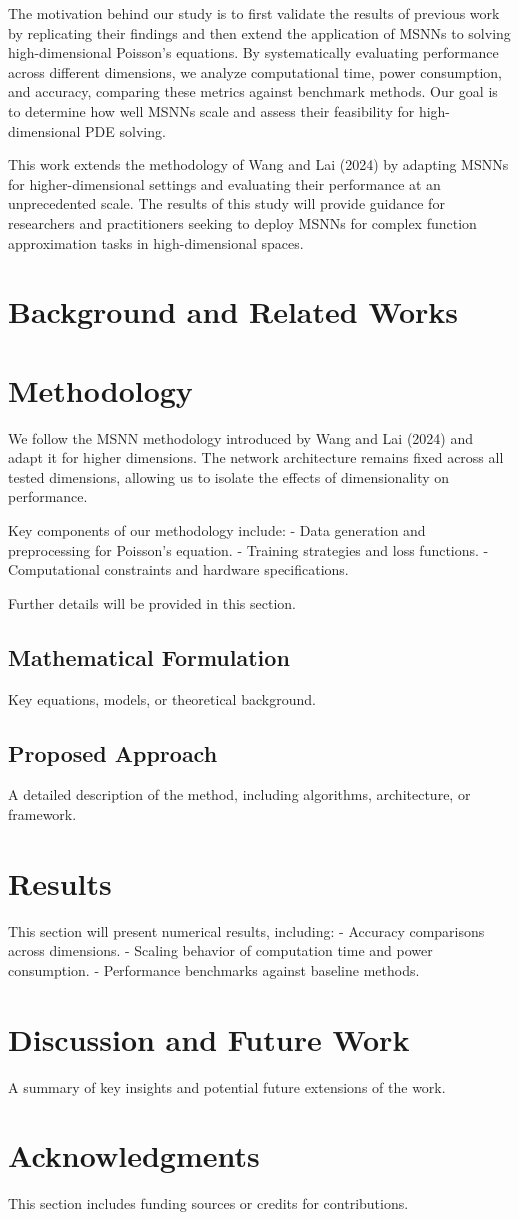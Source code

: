 \documentclass[a4paper,12pt]{article}
\begin{document}
The motivation behind our study is to first validate the results of previous work by replicating their findings and then extend the application of MSNNs to solving high-dimensional Poisson’s equations. By systematically evaluating performance across different dimensions, we analyze computational time, power consumption, and accuracy, comparing these metrics against benchmark methods. Our goal is to determine how well MSNNs scale and assess their feasibility for high-dimensional PDE solving.

This work extends the methodology of Wang and Lai (2024) by adapting MSNNs for higher-dimensional settings and evaluating their performance at an unprecedented scale. The results of this study will provide guidance for researchers and practitioners seeking to deploy MSNNs for complex function approximation tasks in high-dimensional spaces.

\section{Background and Related Works}


\section{Methodology}
We follow the MSNN methodology introduced by Wang and Lai (2024) and adapt it for higher dimensions. The network architecture remains fixed across all tested dimensions, allowing us to isolate the effects of dimensionality on performance. 

Key components of our methodology include:
- Data generation and preprocessing for Poisson's equation.
- Training strategies and loss functions.
- Computational constraints and hardware specifications.

Further details will be provided in this section.

\subsection{Mathematical Formulation}
Key equations, models, or theoretical background.

\subsection{Proposed Approach}
A detailed description of the method, including algorithms, architecture, or framework.

\section{Results}
This section will present numerical results, including:
- Accuracy comparisons across dimensions.
- Scaling behavior of computation time and power consumption.
- Performance benchmarks against baseline methods.

\section{Discussion and Future Work}
\noindent A summary of key insights and potential future extensions of the work.

\section*{Acknowledgments}
\noindent This section includes funding sources or credits for contributions.



\end{document}
